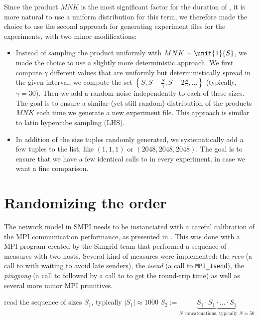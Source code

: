             Since the product \(MNK\) is the most significant factor for the duration of \dgemm, it is more natural to
            use a uniform distribution for this term, we therefore made the choice to use the second approach for
            generating experiment files for the \dgemm experiments, with two minor modifications:
            \begin{itemize}
                \item Instead of sampling the product uniformly with \(MNK\sim\unif{1}{S}\), we made the choice to use a
                    slightly more deterministic approach. We first compute $\gamma$ different values that are uniformly
                    but deterministically spread in the given interval, \ie we compute the set
                    \(\left\{S, S-\frac{S}{\gamma},S-2\frac{S}{\gamma}, \dots\right\}\)
                    (typically, \(\gamma=30\)). Then we add a random noise independently to each of these sizes. The
                    goal is to ensure a similar (yet still random) distribution of the products \(MNK\) each time we
                    generate a new experiment file. This approach is similar to latin hypercube sampling (LHS).
                \item In addition of the size tuples randomly generated, we systematically add a few tuples to the list,
                    like \((1,1,1)\) or \((2048,2048,2048)\). The goal is to ensure that we have a few identical calls to
                    \dgemm in every experiment, in case we want a fine comparison.
            \end{itemize}

    \section{Randomizing the order}%
    \label{sec:randomizing_order}
        The network model in SMPI needs to be instanciated with a careful calibration of the MPI communication
        performance, as presented in \cite{smpi}. This was done with a MPI program created by the Simgrid team that
        performed a sequence of measures with two hosts. Several kind of measures were implemented: the \emph{recv}
        (a call to \recv with waiting to avoid late senders), the \emph{isend} (a call to
        \texttt{MPI\_Isend}), the \emph{pingpong} (a call to \send followed by a call to \recv
        to get the round-trip time) as well as several more minor MPI primitives.

        \begin{algorithm}[H]
            read the sequence of sizes \(S_1\), typically \(|S_1| \approx 1000\)\;
            \(S_2 := \underbrace{S_1\cdot S_1\cdot\dots\cdot S_1}_{N\text{ concatenations, typically } N\approx 50}\)\;
        \end{algorithm}

